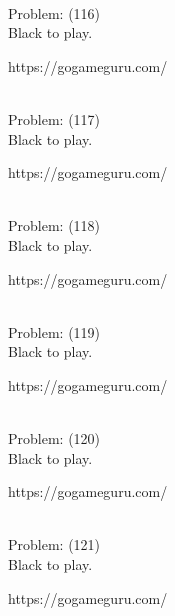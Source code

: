 \documentclass[11pt]{article}
\begin{document}
\begin{minipage}[t]{0.5\textwidth}
  {\centering
  
\\
  Problem: (116)\\
  Black to play.

https://gogameguru.com/\\
  }
\end{minipage}
\begin{minipage}[t]{0.5\textwidth}
  {\centering
  
\\
  Problem: (117)\\
  Black to play.

https://gogameguru.com/\\
  }
\end{minipage}
\begin{minipage}[t]{0.5\textwidth}
  {\centering
  
\\
  Problem: (118)\\
  Black to play.

https://gogameguru.com/\\
  }
\end{minipage}
\begin{minipage}[t]{0.5\textwidth}
  {\centering
  
\\
  Problem: (119)\\
  Black to play.

https://gogameguru.com/\\
  }
\end{minipage}
\begin{minipage}[t]{0.5\textwidth}
  {\centering
  
\\
  Problem: (120)\\
  Black to play.

https://gogameguru.com/\\
  }
\end{minipage}
\begin{minipage}[t]{0.5\textwidth}
  {\centering
  
\\
  Problem: (121)\\
  Black to play.

https://gogameguru.com/\\
  }
\end{minipage}
\end{document}
